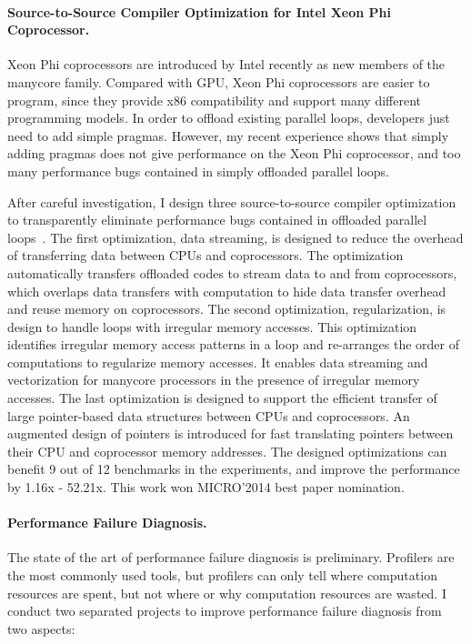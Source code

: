 \documentclass[10pt]{article}
\begin{document}
\paragraph{Source-to-Source Compiler Optimization for Intel Xeon Phi Coprocessor.}
Xeon Phi coprocessors are introduced by Intel recently as new members of the manycore family. 
Compared with GPU, Xeon Phi coprocessors are easier to program, 
since they provide x86 compatibility and support many different programming models. 
In order to offload existing parallel loops, developers just need to add simple pragmas. 
However, my recent experience shows that simply adding pragmas does not give performance on the Xeon Phi coprocessor, 
and too many performance bugs contained in simply offloaded parallel loops. 

After careful investigation, I design three source-to-source compiler optimization to 
transparently eliminate performance bugs contained in offloaded parallel loops~\cite{Song14MICRO}. 
The first optimization, data streaming, is designed to reduce the overhead of transferring data between CPUs and coprocessors. 
The optimization automatically transfers offloaded codes to stream data to and from coprocessors, which overlaps data transfers 
with computation to hide data transfer overhead and reuse memory on coprocessors. 
The second optimization, regularization, is design to handle loops with irregular memory accesses. 
This optimization identifies irregular memory access patterns in a loop and re-arranges the order of computations to regularize memory accesses. 
It enables data streaming and vectorization for manycore processors in the presence of irregular memory accesses. 
The last optimization is designed to support the efficient transfer of large pointer-based data structures between CPUs and coprocessors. 
An augmented design of pointers is introduced for fast translating pointers between their CPU and coprocessor memory addresses. 
The designed optimizations can benefit 9 out of 12 benchmarks in the experiments, and improve the performance by 1.16x - 52.21x. 
This work won MICRO'2014 best paper nomination. 



\paragraph{Performance Failure Diagnosis.}

The state of the art of performance failure diagnosis is preliminary. 
Profilers are the most commonly used tools, but profilers can only tell where computation resources are spent, 
but not where or why computation resources are wasted.
I conduct two separated projects to improve performance failure diagnosis from two aspects:
\end{document}
